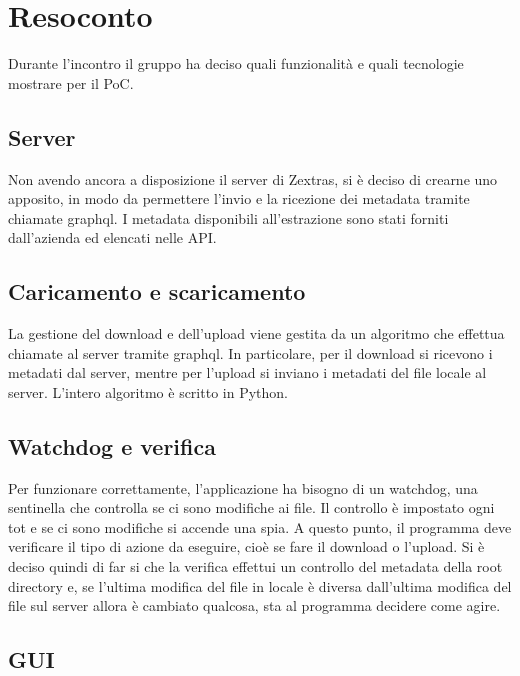 \newpage


\section{Resoconto}

Durante l'incontro il gruppo \gruppo{} ha deciso quali funzionalità e quali tecnologie mostrare per il PoC.

\subsection{Server}

Non avendo ancora a disposizione il server di Zextras, si è deciso di crearne uno apposito, in modo da permettere l'invio e la ricezione dei metadata tramite chiamate graphql. I metadata disponibili all'estrazione sono stati forniti dall'azienda ed elencati nelle API.

\subsection{Caricamento e scaricamento }

La gestione del download e dell'upload viene gestita da un algoritmo che effettua chiamate al server tramite graphql. In particolare, per il download si ricevono i metadati dal server, mentre per l'upload si inviano i metadati del file locale al server.  L'intero algoritmo è scritto in Python.

\subsection{Watchdog e verifica}

Per funzionare correttamente, l'applicazione ha bisogno di un watchdog, una sentinella che controlla se ci sono modifiche ai file. Il controllo è impostato ogni tot e se ci sono modifiche si accende una spia. A questo punto, il programma deve verificare il tipo di azione da eseguire, cioè se fare il download o l'upload. Si è deciso quindi di far si che la verifica effettui un controllo del metadata della root directory e, se l'ultima modifica del file in locale è diversa dall'ultima modifica del file sul server allora è cambiato qualcosa, sta al programma decidere come agire. 

\subsection{GUI}

